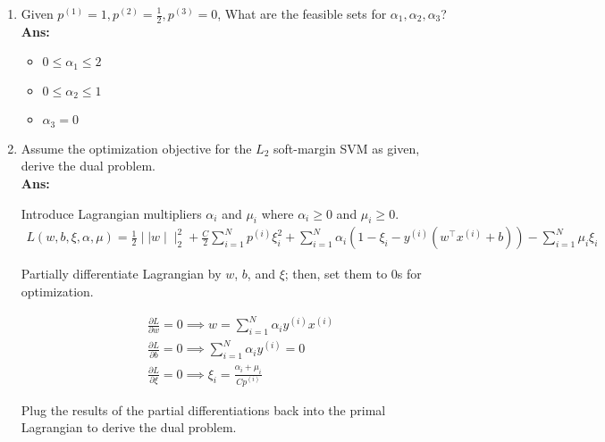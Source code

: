 \documentclass{article}
\theoremstyle{definition}
\theoremstyle{remark}
\begin{document}
\begin{enumerate}[font={\Large\bfseries},left=0pt]
\begin{tcolorbox}
\begin{enumerate}
\begin{enumerate}
				      \item Given $p^{(1)} = 1, p^{(2)} = \frac{1}{2}, p^{(3)} = 0$, What are the feasible sets for $\alpha_1, \alpha_2, \alpha_3$? \\
				            \textbf{Ans:} \\
				            \begin{itemize}
					            \item $0 \le \alpha_1 \le 2$
					            \item $0 \le \alpha_2 \le 1$
					            \item $\alpha_3 = 0$
				            \end{itemize}

				      \item Assume the optimization objective for the $L_2$ soft-margin SVM as given, derive the dual problem. \\
				            \textbf{Ans: }

				            Introduce Lagrangian multipliers $\alpha_i$ and $\mu_i$ where $\alpha_i \ge 0$ and $\mu_i \ge 0$. \\
				            \begin{align}
					            L(w, b, \xi, \alpha, \mu) = \frac{1}{2} \mid\mid w \mid\mid^2_2 + \frac{C}{2}\sum^{N}_{i = 1}p^{(i)} \xi_i^2 + \sum^{N}_{i = 1}\alpha_i (1 - \xi_i - y^{(i)}(w^\intercal x^{(i)} + b)) - \sum^{N}_{i=1} \mu_i \xi_i
				            \end{align}

				            Partially differentiate Lagrangian by $w$, $b$, and $\xi$; then, set them to 0s for optimization.

				            \begin{align}
					             & \frac{\partial L}{\partial w} = 0 \implies w = \sum^{N}_{i = 1} \alpha_i y^{(i)}x^{(i)}   \\
					             & \frac{\partial L}{\partial b} = 0 \implies \sum^{N}_{i = 1} \alpha_i y^{(i)} = 0          \\
					             & \frac{\partial L }{\partial \xi} = 0 \implies \xi_i = \frac{\alpha_i + \mu_i }{C p^{(i)}}
				            \end{align}


				            Plug the results of the partial differentiations back into the primal Lagrangian to derive the dual problem.


\end{enumerate}
\end{enumerate}
\end{tcolorbox}
\end{enumerate}
\end{document}
